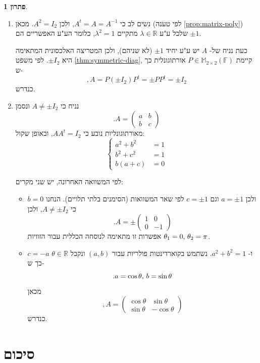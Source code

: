 \documentclass[12pt]{report}
\theoremstyle{plain}
\theoremstyle{definition}
\newtheorem*{solution}{פתרון}
\newcommand{\R}{\mathbb{R}}
\newcommand{\F}{\mathbb{F}}
\newcommand{\M}{\mathbb{M}}
\newcommand{\0}{\mathbf{0}}
\begin{document}
\begin{solution}\
\begin{enumerate}[label=\alph*.]
\item
נשים לב כי
$A^t=A=A^{-1}$,
ולכן
$A^2=I_2$.
מכאן (לפי טענה
\ref{prop:matrix-poly})
שלכל ע"ע
$\lambda\in\R$
מתקיים
$\lambda^2=1$,
כלומר הע"ע האפשריים הם 
$\pm 1$.

כעת נניח של-
$A$
יש ע"ע יחיד
$\pm 1$
(לא שניהם),
ולכן המטריצה האלכסונית המתאימה היא
$\pm I_2$.
לפי משפט
\ref{thm:symmetric-diag},
קיימת
$P\in\M_{2\times 2}(\F)$
אורתוגונלית כך ש-
$$
,A=P(\pm I_2)P^t=\pm PP^t=\pm I_2
$$
כנדרש.


\item
נניח כי
$A\neq\pm I_2$
ונסמן
$$
.A=\begin{pmatrix}
a & b \\
b & c
\end{pmatrix}
$$
מאורתוגונליות נובע כי
$AA^t=I_2$,
ובאופן שקול:
$$
\begin{cases}
a^2+b^2&=1 \\
b^2+c^2&=1 \\
b(a+c)&=0
\end{cases}
$$

לפי המשוואה האחרונה, יש שני מקרים:
\begin{itemize}
\item 
$b=0$
ולכן 
$a=\pm 1$
וגם
$c=\pm 1$
לפי שאר המשוואות (הסימנים בלתי תלויים).
הנחנו כי
$A\neq\pm I_2$,
ולכן
$$
.A=\pm\begin{pmatrix}
1 & 0 \\
0 & -1
\end{pmatrix}
$$
אפשרות זו מתאימה לנוסחה הכללית עבור הזוויות
$\theta_1=0,\thinspace\theta_2=\pi$.


\item
$c=-a$
ו-
$a^2+b^2=1$.
נשתמש בקוארדינטות פולריות עבור
$(a,b)$
ונקבל
$\theta\in\R$
כך ש-
$$
.a=\cos\theta,\thinspace b=\sin\theta
$$
מכאן
$$
,A=\begin{pmatrix}
\cos\theta & \sin\theta \\
\sin\theta & -\cos\theta
\end{pmatrix}
$$
כנדרש.
\end{itemize}


\end{enumerate}
\end{solution}

\clearpage
\section{סיכום}
\end{document}
